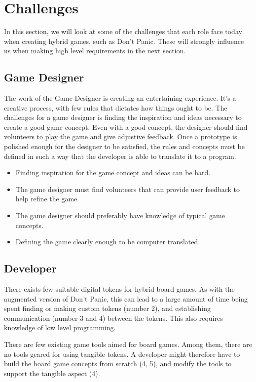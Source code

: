 \section{Challenges} \label{sec:problem_challenges}

In this section, we will look at some of the challenges that each role face today when creating hybrid games, such as Don't Panic. These will strongly influence us when making high level requirements in the next section.

\subsection{Game Designer}
The work of the Game Designer is creating an entertaining experience. It's a creative process, with few rules that dictates how things ought to be. The challenges for a game designer is finding the inspiration and ideas necessary to create a good game concept. Even with a good concept, the designer should find volunteers to play the game and give adjustive feedback. Once a prototype is polished enough for the designer to be satisfied, the rules and concepts must be defined in such a way that the developer is able to translate it to a program.

\begin{itemize}
\item Finding inspiration for the game concept and ideas can be hard.
\item The game designer must find volunteers that can provide user feedback to help refine the game.
\item The game designer should preferably have knowledge of typical game concepts.
\item Defining the game clearly enough to be computer translated.
\end{itemize}

\subsection{Developer}
There exists few suitable digital tokens for hybrid board games. As with the augmented version of Don't Panic, this can lead to a large amount of time being spent finding or making custom tokens (number 2), and establishing communication (number 3 and 4) between the tokens. This also requires knowledge of low level programming. 

There are few existing game tools aimed for board games. Among them, there are no tools geared for using tangible tokens. A developer might therefore have to build the board game concepts from scratch (4, 5), and modify the tools to support the tangible aspect (4).

